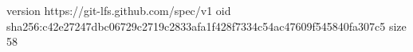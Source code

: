 version https://git-lfs.github.com/spec/v1
oid sha256:c42e27247dbc06729c2719c2833afa1f428f7334c54ac47609f545840fa307c5
size 58
